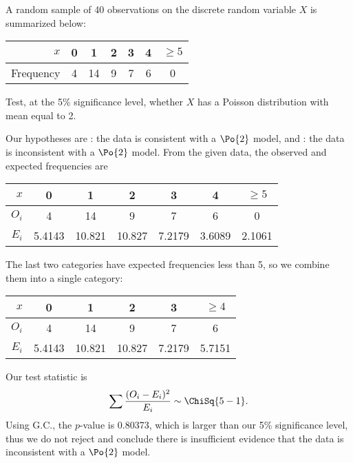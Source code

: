 \begin{sample}
    A random sample of 40 observations on the discrete random variable $X$ is summarized below:

    \begin{table}[H]
        \centering
        \begin{tabular}{|r|c|c|c|c|c|c|}
        \hline
        $x$ & 0 & 1 & 2 & 3 & 4 & $\geq 5$ \\ \hline
        Frequency & 4 & 14 & 9 & 7 & 6 & 0 \\ \hline
        \end{tabular}
    \end{table}

    Test, at the 5\% significance level, whether $X$ has a Poisson distribution with mean equal to 2.
\end{sample}
\begin{sampans}
    Our hypotheses are \nullhyp: the data is consistent with a $\Po{2}$ model, and \althyp: the data is inconsistent with a $\Po{2}$ model. From the given data, the observed and expected frequencies are

    \begin{table}[H]
        \centering
        \begin{tabular}{|r|c|c|c|c|c|c|}
        \hline
        $x$ & 0 & 1 & 2 & 3 & 4 & $\geq 5$ \\ \hline
        $O_i$ & 4 & 14 & 9 & 7 & 6 & 0 \\ \hline
        $E_i$ & 5.4143 & 10.821 & 10.827 & 7.2179 & 3.6089 & 2.1061 \\ \hline
        \end{tabular}
    \end{table}
    The last two categories have expected frequencies less than 5, so we combine them into a single category:
    \begin{table}[H]
        \centering
        \begin{tabular}{|r|c|c|c|c|c|}
        \hline
        $x$ & 0 & 1 & 2 & 3 & $\geq 4$ \\ \hline
        $O_i$ & 4 & 14 & 9 & 7 & 6 \\ \hline
        $E_i$ & 5.4143 & 10.821 & 10.827 & 7.2179 & 5.7151 \\ \hline
        \end{tabular}
    \end{table}
    Our test statistic is \[\sum \frac{(O_i - E_i)^2}{E_i} \sim \ChiSq{5-1}.\] Using G.C., the $p$-value is 0.80373, which is larger than our 5\% significance level, thus we do not reject \nullhyp{} and conclude there is insufficient evidence that the data is inconsistent with a $\Po{2}$ model.
\end{sampans}

